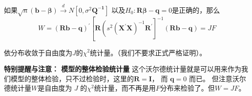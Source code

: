 \begin{theorem}[沃尔德统计量的极限分布定理]
    如果$ \sqrt{n}(\boldsymbol{b-\beta}) \stackrel{d}{\longrightarrow} N \left[0, \sigma^{2} \boldsymbol{Q^{-1}}\right] $
    以及$ H_{0}: \boldsymbol{R \beta-q} = 0 $是正确的，那么
    $$ W=(\boldsymbol{R b-q})^{\prime} \left[\boldsymbol{R}\left(s^{2}\left(\boldsymbol{X^{\prime} X}\right)^{-1} \boldsymbol{R^{\prime}}\right]^{-1}
    (\boldsymbol{R b-q})=J F\right. $$
\end{theorem}

依分布收敛于自由度为$ J $的$ \chi^{2} $统计量。（我们不要求正式严格证明）。

{\bf 特别提醒与注意： 模型的整体检验统计量}
这个沃尔德统计量就是可以用来作为我们模型的整体检验，只不过检验时，这里的$ \boldsymbol{R = I} $， 而 $ \boldsymbol{q} = 0 $ 而已。
但注意沃尔德统计量$ W $是自由度为 $ J $ 的$ \chi^{2} $统计量，而不再是用$ F $分布来检验了。但$ W = JF $。
